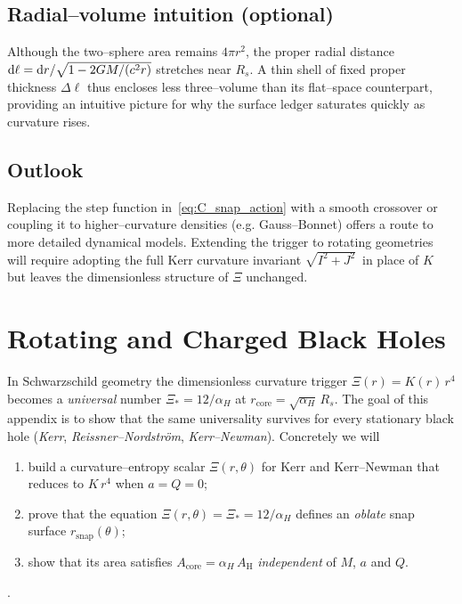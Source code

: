 \documentclass[a4paper, 12pt, oneside]{book}
\numberwithin{equation}{chapter}
\begin{document}
\section{Radial--volume intuition (optional)}
\label{sec:C_radial_volume}
Although the two--sphere area remains $4\pi r^{2}$, the proper radial distance ${\rm d}\ell = {\rm d}r/\sqrt{1-2GM/(c^{2}r)}$ stretches near $R_s$.  A thin shell of fixed proper thickness $\Delta\ell$ thus encloses less three--volume than its flat--space counterpart, providing an intuitive picture for why the surface ledger saturates quickly as curvature rises.

\section{Outlook}
\label{sec:C_outlook}
Replacing the step function in~\eqref{eq:C_snap_action} with a smooth crossover or coupling it to higher--curvature densities (e.g. Gauss--Bonnet) offers a route to more detailed dynamical models.  Extending the trigger to rotating geometries will require adopting the full Kerr curvature invariant $\sqrt{I^{2}+J^{2}}\,$ in place of $K$ but leaves the dimensionless structure of $\Xi$ unchanged.


\chapter{Rotating and Charged Black Holes}
\label{appendix:KerrSnap}

\noindent
In Schwarzschild geometry the dimensionless curvature trigger
\(\Xi(r)=K(r)\,r^{4}\) becomes a \emph{universal} number
\(\Xi_{*}=12/\alpha_{H}\) at
\(r_{\mathrm{core}}=\sqrt{\alpha_{H}}\,R_{s}\).
The goal of this appendix is to show that the same universality survives
for every stationary black hole (\emph{Kerr}, \emph{Reissner–Nordstr\"om},
\emph{Kerr–Newman}).  Concretely we will

\begin{enumerate}[label=\alph*)]
\item build a curvature--entropy scalar \(\Xi(r,\theta)\) for Kerr and
      Kerr--Newman that reduces to \(K\,r^{4}\) when \(a=Q=0\);
\item prove that the equation
      \(\Xi(r,\theta)=\Xi_{*}=12/\alpha_{H}\) defines an \emph{oblate}
      snap surface \(r_{\mathrm{snap}}(\theta)\);
\item show that its area satisfies
      \(\displaystyle A_{\mathrm{core}}=\alpha_{H}\,A_{\mathrm H}\)
      \emph{independent} of \(M\), \(a\) and \(Q\).
\end{enumerate}.
\end{document}
